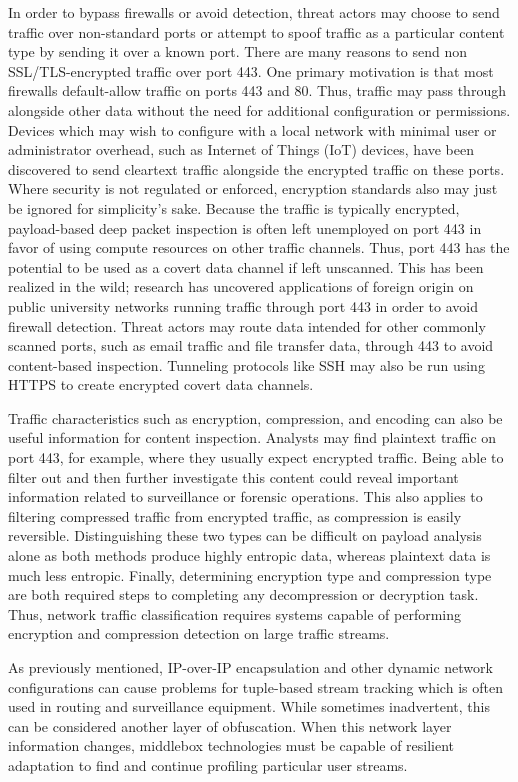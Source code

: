 In order to bypass firewalls or avoid detection, threat actors may choose to send traffic over non-standard ports or attempt to spoof traffic as a particular content type by sending it over a known port. There are many reasons to send non SSL/TLS-encrypted traffic over port 443. One primary motivation is that most firewalls default-allow traffic on ports 443 and 80. Thus, traffic may pass through alongside other data without the need for additional configuration or permissions. Devices which may wish to configure with a local network with minimal user or administrator overhead, such as Internet of Things (IoT) devices, have been discovered to send cleartext traffic alongside the encrypted traffic on these ports. Where security is not regulated or enforced, encryption standards also may just be ignored for simplicity's sake. Because the traffic is typically encrypted, payload-based deep packet inspection is often left unemployed on port 443 in favor of using compute resources on other traffic channels. Thus, port 443 has the potential to be used as a covert data channel if left unscanned. This has been realized in the wild; research has uncovered applications of foreign origin on public university networks running traffic through port 443 in order to avoid firewall detection. Threat actors may route data intended for other commonly scanned ports, such as email traffic and file transfer data, through 443 to avoid content-based inspection. Tunneling protocols like SSH may also be run using HTTPS to create encrypted covert data channels.

Traffic characteristics such as encryption, compression, and encoding can also be useful information for content inspection. Analysts may find plaintext traffic on port 443, for example, where they usually expect encrypted traffic. Being able to filter out and then further investigate this content could reveal important information related to surveillance or forensic operations. This also applies to filtering compressed traffic from encrypted traffic, as compression is easily reversible. Distinguishing these two types can be difficult on payload analysis alone as both methods produce highly entropic data, whereas plaintext data is much less entropic. Finally, determining encryption type and compression type are both required steps to completing any decompression or decryption task. Thus, network traffic classification requires systems capable of performing encryption and compression detection on large traffic streams.

As previously mentioned, IP-over-IP encapsulation and other dynamic network configurations can cause problems for tuple-based stream tracking which is often used in routing and surveillance equipment. While sometimes inadvertent, this can be considered another layer of obfuscation. When this network layer information changes, middlebox technologies must be capable of resilient adaptation to find and continue profiling particular user streams.

